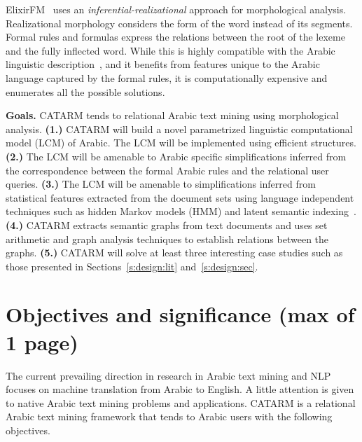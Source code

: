 \documentclass[12pt]{article}
\newcommand{\noTrRL}[1]{\transfalse\RL{#1}\transtrue}
\begin{document}
{ElixirFM~\cite{Otakar:07} uses an {\em inferential-realizational}
approach for morphological analysis. 
Realizational morphology considers the form of the word 
\noTrRL{.sarf}  instead of its segments. 
Formal rules and formulas express the relations between 
the root of the lexeme and the fully inflected word. 
While this is highly compatible with the Arabic linguistic 
description~\cite{Badawi:04},
and it benefits from features unique to the Arabic language
captured by the formal rules, 
it is computationally expensive and enumerates all the possible
solutions. 

{\bf Goals.} CATARM 
tends to relational Arabic text mining using morphological analysis.
{\bf (1.)} CATARM will build a novel parametrized 
linguistic computational model (LCM) of Arabic. 
The LCM will be implemented using efficient structures. 
 {\bf (2.)} The LCM will be amenable to Arabic specific simplifications 
inferred from the correspondence between the formal Arabic rules
and the relational user queries.
{\bf (3.)} The LCM will be amenable to simplifications 
inferred from statistical features extracted from the document 
sets using language independent techniques such as 
hidden Markov models (HMM)  and 
latent semantic indexing~\cite{LSI89}.
{\bf (4.)} CATARM extracts semantic graphs from text 
documents and uses set arithmetic and graph analysis techniques
to establish relations between the graphs. {\bf (5.)} CATARM will 
solve at least three interesting case studies such as those
presented in Sections~\ref{s:design:lit} and~\ref{s:design:sec}.

\pagebreak

\section{Objectives and significance (max of 1 page) } 
\label{s:objectives}

The current prevailing direction in research 
in Arabic text mining and NLP focuses on machine translation from 
Arabic to English. 
A little attention is given to native Arabic text mining 
problems and applications. 
CATARM is a relational Arabic text mining 
framework that tends to Arabic users 
with the following objectives.

}
\end{document}
